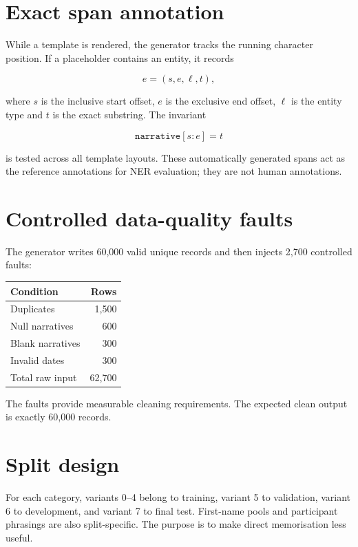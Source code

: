\documentclass[12pt,a4paper]{report}
\begin{document}
\section{Exact span annotation}

While a template is rendered, the generator tracks the running character position. If a placeholder contains an entity, it records

\begin{equation}
e=(s,e,\ell,t),
\end{equation}

where $s$ is the inclusive start offset, $e$ is the exclusive end offset, $\ell$ is the entity type and $t$ is the exact substring. The invariant

\begin{equation}
\texttt{narrative}[s:e]=t
\end{equation}

is tested across all template layouts. These automatically generated spans act as the reference annotations for NER evaluation; they are not human annotations.

\section{Controlled data-quality faults}

The generator writes 60,000 valid unique records and then injects 2,700 controlled faults:

\begin{center}
\begin{tabular}{lr}
\toprule
Condition & Rows \\
\midrule
Duplicates & 1,500 \\
Null narratives & 600 \\
Blank narratives & 300 \\
Invalid dates & 300 \\
\midrule
Total raw input & 62,700 \\
\bottomrule
\end{tabular}
\end{center}

The faults provide measurable cleaning requirements. The expected clean output is exactly 60,000 records.

\section{Split design}

For each category, variants 0--4 belong to training, variant 5 to validation, variant 6 to development, and variant 7 to final test. First-name pools and participant phrasings are also split-specific. The purpose is to make direct memorisation less useful.
\end{document}
